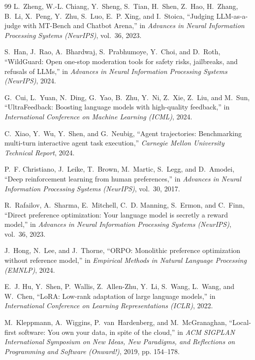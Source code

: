 \documentclass[12pt,a4paper]{report}
\begin{document}
\begin{thebibliography}{99}
L.~Zheng, W.-L. Chiang, Y.~Sheng, S.~Tian, H.~Shen, Z.~Hao, H.~Zhang, B.~Li, X.~Peng, Y.~Zhu, S.~Luo, E.~P. Xing, and I.~Stoica, ``Judging LLM-as-a-judge with MT-Bench and Chatbot Arena,'' in \emph{Advances in Neural Information Processing Systems (NeurIPS)}, vol.~36, 2023.

S.~Han, J.~Rao, A.~Bhardwaj, S.~Prabhumoye, Y.~Choi, and D.~Roth, ``WildGuard: Open one-stop moderation tools for safety risks, jailbreaks, and refusals of LLMs,'' in \emph{Advances in Neural Information Processing Systems (NeurIPS)}, 2024.

G.~Cui, L.~Yuan, N.~Ding, G.~Yao, B.~Zhu, Y.~Ni, Z.~Xie, Z.~Liu, and M.~Sun, ``UltraFeedback: Boosting language models with high-quality feedback,'' in \emph{International Conference on Machine Learning (ICML)}, 2024.

C.~Xiao, Y.~Wu, Y.~Shen, and G.~Neubig, ``Agent trajectories: Benchmarking multi-turn interactive agent task execution,'' \emph{Carnegie Mellon University Technical Report}, 2024.

P.~F. Christiano, J.~Leike, T.~Brown, M.~Martic, S.~Legg, and D.~Amodei, ``Deep reinforcement learning from human preferences,'' in \emph{Advances in Neural Information Processing Systems (NeurIPS)}, vol.~30, 2017.

R.~Rafailov, A.~Sharma, E.~Mitchell, C.~D. Manning, S.~Ermon, and C.~Finn, ``Direct preference optimization: Your language model is secretly a reward model,'' in \emph{Advances in Neural Information Processing Systems (NeurIPS)}, vol.~36, 2023.

J.~Hong, N.~Lee, and J.~Thorne, ``ORPO: Monolithic preference optimization without reference model,'' in \emph{Empirical Methods in Natural Language Processing (EMNLP)}, 2024.

E.~J. Hu, Y.~Shen, P.~Wallis, Z.~Allen-Zhu, Y.~Li, S.~Wang, L.~Wang, and W.~Chen, ``LoRA: Low-rank adaptation of large language models,'' in \emph{International Conference on Learning Representations (ICLR)}, 2022.

M.~Kleppmann, A.~Wiggins, P.~van~Hardenberg, and M.~McGranaghan, ``Local-first software: You own your data, in spite of the cloud,'' in \emph{ACM SIGPLAN International Symposium on New Ideas, New Paradigms, and Reflections on Programming and Software (Onward!)}, 2019, pp. 154--178.


\end{thebibliography}
\end{document}
